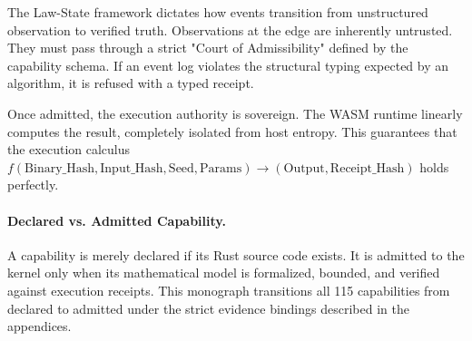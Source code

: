The Law-State framework dictates how events transition from unstructured observation to verified truth. Observations at the edge are inherently untrusted. They must pass through a strict "Court of Admissibility" defined by the capability schema. If an event log violates the structural typing expected by an algorithm, it is refused with a typed  receipt.

Once admitted, the execution authority is sovereign. The WASM runtime linearly computes the result, completely isolated from host entropy. This guarantees that the execution calculus $f(\text{Binary\_Hash}, \text{Input\_Hash}, \text{Seed}, \text{Params}) \to (\text{Output}, \text{Receipt\_Hash})$ holds perfectly.

\paragraph{Declared vs. Admitted Capability.} 
A capability is merely declared if its Rust source code exists. It is admitted to the kernel only when its mathematical model is formalized, bounded, and verified against execution receipts. This monograph transitions all 115 capabilities from declared to admitted under the strict evidence bindings described in the appendices.
